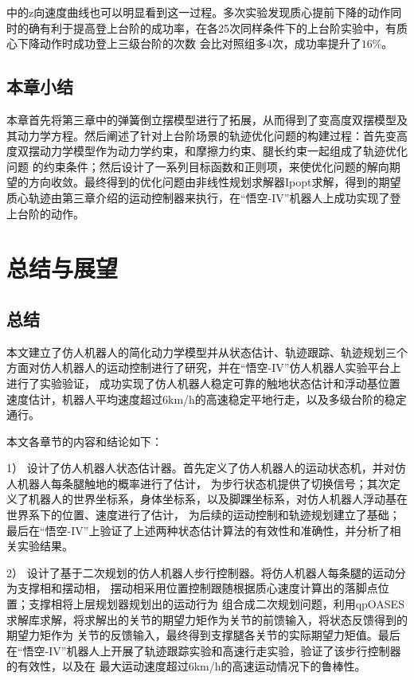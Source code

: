 中的z向速度曲线也可以明显看到这一过程。多次实验发现质心提前下降的动作同时的确有利于提高登上台阶的成功率，在各25次同样条件下的上台阶实验中，有质心下降动作时成功登上三级台阶的次数
会比对照组多4次，成功率提升了$16\%$。

\section{本章小结}
本章首先将第三章中的弹簧倒立摆模型进行了拓展，从而得到了变高度双摆模型及其动力学方程。然后阐述了针对上台阶场景的轨迹优化问题的构建过程：首先变高度双摆动力学模型作为动力学约束，和摩擦力约束、腿长约束一起组成了轨迹优化问题
的约束条件；然后设计了一系列目标函数和正则项，来使优化问题的解向期望的方向收敛。最终得到的优化问题由非线性规划求解器Ipopt求解，得到的期望质心轨迹由第三章介绍的运动控制器来执行，在“悟空-IV”机器人上成功实现了登上台阶的动作。
\chapter{总结与展望}
\section{总结}
本文建立了仿人机器人的简化动力学模型并从状态估计、轨迹跟踪、轨迹规划三个方面对仿人机器人的运动控制进行了研究，并在“悟空-IV”仿人机器人实验平台上进行了实验验证，
成功实现了仿人机器人稳定可靠的触地状态估计和浮动基位置速度估计，机器人平均速度超过6km/h的高速稳定平地行走，以及多级台阶的稳定通行。

本文各章节的内容和结论如下：

1） 设计了仿人机器人状态估计器。首先定义了仿人机器人的运动状态机，并对仿人机器人每条腿触地的概率进行了估计，
为步行状态机提供了切换信号；其次定义了机器人的世界坐标系，身体坐标系，以及脚踝坐标系，对仿人机器人浮动基在世界系下的位置、速度进行了估计，
为后续的运动控制和轨迹规划建立了基础；最后在“悟空-IV”上验证了上述两种状态估计算法的有效性和准确性，并分析了相关实验结果。

2） 设计了基于二次规划的仿人机器人步行控制器。将仿人机器人每条腿的运动分为支撑相和摆动相，
摆动相采用位置控制跟随根据质心速度计算出的落脚点位置；支撑相将上层规划器规划出的运动行为
组合成二次规划问题，利用qpOASES求解库求解，将求解出的关节的期望力矩作为关节的前馈输入，将状态反馈得到的期望力矩作为
关节的反馈输入，最终得到支撑腿各关节的实际期望力矩值。最后在“悟空-IV”机器人上开展了轨迹跟踪实验和高速行走实验，验证了该步行控制器的有效性，以及在
最大运动速度超过6km/h的高速运动情况下的鲁棒性。


